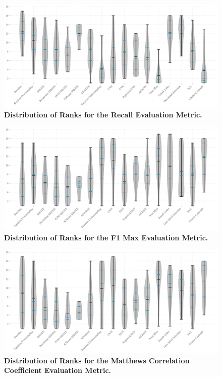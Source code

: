 \documentclass[conference]{IEEEtran}
\begin{document}
\clearpage
\begin{figure}
    \centering
    \includegraphics[width=0.9\linewidth]{plots/recall_ranks_distribution.pdf}
    \caption{\textbf{Distribution of Ranks for the Recall Evaluation Metric.}}
\end{figure}

\begin{figure}
    \centering
    \includegraphics[width=0.9\linewidth]{plots/f1_max_ranks_distribution.pdf}
    \caption{\textbf{Distribution of Ranks for the F1 Max Evaluation Metric.}}
\end{figure}

\clearpage
\begin{figure}[H]
    \centering
    \includegraphics[width=0.9\linewidth]{plots/matthews_corr_coef_ranks_distribution.pdf}
    \caption{\textbf{Distribution of Ranks for the Matthews Correlation Coefficient Evaluation Metric.}}
\end{figure}
\end{document}
